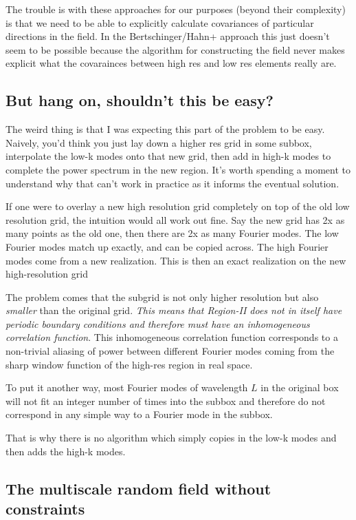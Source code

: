 \documentclass[11pt,a4paper,preprint]{aastex}
\begin{document}
The trouble is with these approaches for our purposes (beyond their
complexity) is that we need to be able to explicitly calculate
covariances of particular directions in the field. In the
Bertschinger/Hahn+ approach this just doesn't seem to be possible
because the algorithm for constructing the field never makes explicit
what the covarainces between high res and low res elements really
are. 

\subsection{But hang on, shouldn't this be easy?}

The weird thing is that I was expecting this part of the problem to be
easy. Naively, you'd think you just lay down a higher res grid in some
subbox, interpolate the low-k modes onto that new grid, then add in
high-k modes to complete the power spectrum in the new region. It's
worth spending a moment to understand why that can't work in practice
as it informs the eventual solution.

If one were to overlay a new high resolution grid completely on top of
the old low resolution grid, the intuition would all work out
fine. Say the new grid has 2x as many points as the old one, then
there are 2x as many Fourier modes. The low Fourier modes match up
exactly, and can be copied across. The high Fourier modes come from a
new realization.  This is then an exact realization on the new
high-resolution grid

The problem comes that the subgrid is not only higher resolution but
also {\it smaller} than the original grid. {\it This means that
  Region-II does not in itself have periodic boundary conditions and
  therefore must have an inhomogeneous correlation function}. This
inhomogeneous correlation function corresponds to a non-trivial
aliasing of power between different Fourier modes coming from the
sharp window function of the high-res region in real space.

To put it another way, most Fourier modes of wavelength $L$ in the
original box will not fit an integer number of times into the subbox
and therefore do not correspond in any simple way to a Fourier mode in the
subbox. 

That is why there is no algorithm which simply copies in the low-k
modes and then adds the high-k modes.

\subsection{The multiscale random field without constraints}
\end{document}
